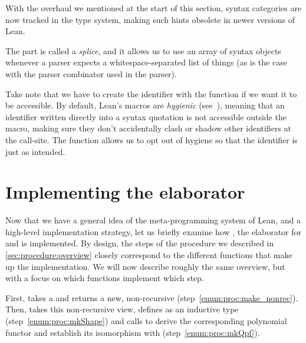 \begin{remark}
    With the overhaul we mentioned at the start of this section, syntax categories are now tracked in the 
    type system, making such hints obsolete in newer versions of Lean.
\end{remark}

The \lean{\$[...]*} part is called a \emph{splice}, and it allows us to use an array of syntax objects whenever a parser expects a whitespace-separated list of things (as is the case with the  parser combinator used in the \inductive{} parser).

Take note that we have to create the identifier  with the  function if
we want it to be accessible. By default, Lean's macros are \emph{hygienic} (see~\cite{ullrichNotationsHygienicMacro2022}),
meaning that an identifier  written directly into a syntax quotation is not accessible outside the macro, making sure they don't accidentally clash or shadow other identifiers at the call-site.
The  function allows us to opt out of hygiene so that the identifier is just  as intended.






\section{Implementing the elaborator}%
\label{sec:implementing}

Now that we have a general idea of the meta-programming system of Lean, and a high-level implementation strategy, let us 
briefly examine how , the elaborator for \data{} and \codata{} is implemented.
By design, the steps of the procedure we described in \cref{sec:procedure:overview} closely correspond to the different functions that make up the  implementation.
We will now describe roughly the same overview, but with a focus
on which functions implement which step.

First,  takes a  and returns a new, non-recursive  (step~\ref{enum:proc:make_nonrec}).
Then,  takes this non-recursive view, defines  as an inductive type (step~\ref{enum:proc:mkShape}) and calls  to derive the corresponding polynomial functor and establish its isomorphism with  (step~\ref{enum:proc:mkQpf}).

